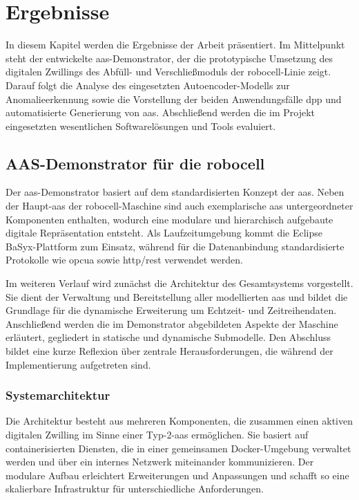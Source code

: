 \newpage
\section{Ergebnisse}
\label{sec:Ergebnisse}
In diesem Kapitel werden die Ergebnisse der Arbeit präsentiert.
Im Mittelpunkt steht der entwickelte \acs{aas}-Demonstrator, der die prototypische Umsetzung des digitalen Zwillings des Abfüll- und Verschließmoduls der robocell-Linie zeigt.
Darauf folgt die Analyse des eingesetzten Autoencoder-Modells zur Anomalieerkennung sowie die Vorstellung der beiden Anwendungsfälle \acs{dpp} und automatisierte Generierung von \acs{aas}.
Abschließend werden die im Projekt eingesetzten wesentlichen Softwarelösungen und Tools evaluiert.

\subsection{AAS-Demonstrator für die robocell}
\label{sec:AAS-Demonstrator}
Der \acs{aas}-Demonstrator basiert auf dem standardisierten Konzept der \acs{aas}.
Neben der Haupt-\acs{aas} der robocell-Maschine sind auch exemplarische \acs{aas} untergeordneter Komponenten enthalten, wodurch eine modulare und hierarchisch aufgebaute digitale Repräsentation entsteht.
Als Laufzeitumgebung kommt die Eclipse BaSyx-Plattform zum Einsatz, während für die Datenanbindung standardisierte Protokolle wie \acs{opcua} sowie \acs{http}/\acs{rest} verwendet werden.

Im weiteren Verlauf wird zunächst die Architektur des Gesamtsystems vorgestellt.
Sie dient der Verwaltung und Bereitstellung aller modellierten \acs{aas} und bildet die Grundlage für die dynamische Erweiterung um Echtzeit- und Zeitreihendaten.
Anschließend werden die im Demonstrator abgebildeten Aspekte der Maschine erläutert, gegliedert in statische und dynamische Submodelle.
Den Abschluss bildet eine kurze Reflexion über zentrale Herausforderungen, die während der Implementierung aufgetreten sind.

\subsubsection{Systemarchitektur}

Die Architektur besteht aus mehreren Komponenten, die zusammen einen aktiven digitalen Zwilling im Sinne einer Typ-2-\acs{aas} ermöglichen.
Sie basiert auf containerisierten Diensten, die in einer gemeinsamen Docker-Umgebung verwaltet werden und über ein internes Netzwerk miteinander kommunizieren.
Der modulare Aufbau erleichtert Erweiterungen und Anpassungen und schafft so eine skalierbare Infrastruktur für unterschiedliche Anforderungen.

